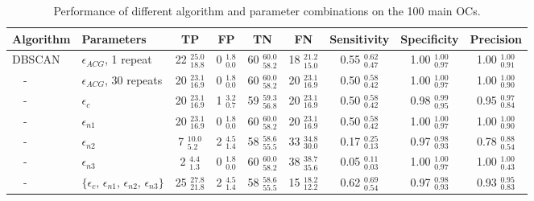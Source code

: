 \begin{table}
\caption{Performance of different algorithm and parameter combinations on the 100 main OCs.}              %
\label{c2:table:classifications}      %
\centering                                      %
\begin{tabular}{l l | c c c c | c c c}          %
\hline\hline                        %

Algorithm & Parameters & TP & FP & TN & FN & Sensitivity & Specificity & Precision \\    
\hline
DBSCAN    & $\epsilon_{ACG}$, 1 repeat   & 22 $^{25.0}_{18.8}$ & 0 $^{1.8}_{0.0}$ & 60 $^{60.0}_{58.2}$ & 18 $^{21.2}_{15.0}$ & 0.55 $^{0.62}_{0.47}$ & 1.00 $^{1.00}_{0.97}$ & 1.00 $^{1.00}_{0.91}$ \rule{0pt}{0.35cm}\\[0.1cm]
$\quad$-  & $\epsilon_{ACG}$, 30 repeats & 20 $^{23.1}_{16.9}$ & 0 $^{1.8}_{0.0}$ & 60 $^{60.0}_{58.2}$ & 20 $^{23.1}_{16.9}$ & 0.50 $^{0.58}_{0.42}$ & 1.00 $^{1.00}_{0.97}$ & 1.00 $^{1.00}_{0.90}$ \\[0.1cm]
$\quad$-  & $\epsilon_{c}$               & 20 $^{23.1}_{16.9}$ & 1 $^{3.2}_{0.7}$ & 59 $^{59.3}_{56.8}$ & 20 $^{23.1}_{16.9}$ & 0.50 $^{0.58}_{0.42}$ & 0.98 $^{0.99}_{0.95}$ & 0.95 $^{0.97}_{0.84}$ \\[0.1cm]
$\quad$-  & $\epsilon_{n1}$              & 20 $^{23.1}_{16.9}$ & 0 $^{1.8}_{0.0}$ & 60 $^{60.0}_{58.2}$ & 20 $^{23.1}_{16.9}$ & 0.50 $^{0.58}_{0.42}$ & 1.00 $^{1.00}_{0.97}$ & 1.00 $^{1.00}_{0.90}$ \\[0.1cm]
$\quad$-  & $\epsilon_{n2}$              & 7 $^{10.0}_{5.2}$ & 2 $^{4.5}_{1.4}$ & 58 $^{58.6}_{55.5}$ & 33 $^{34.8}_{30.0}$ & 0.17 $^{0.25}_{0.13}$ & 0.97 $^{0.98}_{0.93}$ & 0.78 $^{0.88}_{0.54}$ \\[0.1cm]
$\quad$-  & $\epsilon_{n3}$              & 2 $^{4.4}_{1.3}$ & 0 $^{1.8}_{0.0}$ & 60 $^{60.0}_{58.2}$ & 38 $^{38.7}_{35.6}$ & 0.05 $^{0.11}_{0.03}$ & 1.00 $^{1.00}_{0.97}$ & 1.00 $^{1.00}_{0.43}$ \\[0.1cm]
$\quad$-  & $\{ \epsilon_{c}, \, \epsilon_{n1}, \, \epsilon_{n2}, \, \epsilon_{n3} \} $ & 25 $^{27.8}_{21.8}$ & 2 $^{4.5}_{1.4}$ & 58 $^{58.6}_{55.5}$ & 15 $^{18.2}_{12.2}$ & 0.62 $^{0.69}_{0.54}$ & 0.97 $^{0.98}_{0.93}$ & 0.93 $^{0.95}_{0.83}$ \\[0.1cm]

\hline


\end{tabular}
\end{table}
